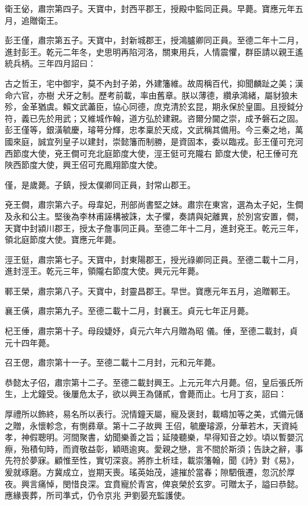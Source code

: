 \begin{pinyinscope}
 衛王佖，肅宗第四子。天寶中，封西平郡王，授殿中監同正員。早薨。寶應元年五月，追贈衛王。



 彭王僅，肅宗第五子。天寶中，封新城郡王，授鴻臚卿同正員。至德二年十二月，進封彭王。乾元二年冬，史思明再陷河洛，關東用兵，人情震懼，群臣請以親王遙統兵柄。三年四月詔曰：



 古之哲王，宅中御宇，莫不內封子弟，外建籓維。故周稱百代，抑聞麟趾之美；漢命六官，亦樹
 犬牙之制。歷考前載，率由舊章。朕以薄德，纘承鴻緒，屬豺狼未殄，金革猶虞。賴文武藎臣，協心同德，庶克清於玄昆，期永保於皇圖。且授鉞分符，義已先於用武；又維城作翰，道方弘於建親。咨爾分閫之崇，成予磐石之固。彭王僅等，銀潢毓慶，璿萼分輝，忠孝稟於天成，文武稱其備用。今三秦之地，萬國來庭，誠宜列皇子以建封，崇懿籓而制勝，是資固本，委以臨戎。彭王僅可充河西節度大使，兗王僴可充北庭節度大使，涇王侹可充隴右
 節度大使，杞王倕可充陜西節度大使，興王佋可充鳳翔節度大使。



 僅，是歲薨。子鎮，授太僕卿同正員，封常山郡王。



 兗王僴，肅宗第六子。母韋妃，刑部尚書堅之妹。肅宗在東宮，選為太子妃，生僴及永和公主。堅後為李林甫誣構被誅，太子懼，奏請與妃離異，於別宮安置，僴，天寶中封潁川郡王，授太子詹事同正員。至德二年十二月，進封兗王。乾元三年，領北庭節度大使。寶應元年薨。



 涇王侹，肅宗第七子。天寶中，封東陽郡王，授光祿卿同正員。至德二載十二月，進封涇王。乾元三年，領隴右節度大使。興元元年薨。



 鄆王榮，肅宗第八子。天寶中，封靈昌郡王。早世。寶應元年五月，追贈鄆王。



 襄王僙，肅宗第九子。至德二載十二月，封襄王。貞元七年正月薨。



 杞王倕，肅宗第十子。母段婕妤，貞元六年六月贈為昭
 儀。倕，至德二載封，貞元十四年薨。



 召王偲，肅宗第十一子。至德二載十二月封，元和元年薨。



 恭懿太子佋，肅宗第十二子。至德二載封興王。上元元年六月薨。佋，皇后張氏所生，上尤鐘受。後屢危太子，欲以興王為儲貳，會薨而止。七月丁亥，詔曰：



 厚禮所以飾終，易名所以表行。況情鐘天屬，寵及褒封，載疇加等之美，式備元儲之贈，永懷軫念，有惻彞章。第十二子故興
 王佋，毓慶璿源，分華若木，天資純孝，神假聰明。河間聚書，幼聞樂善之旨；延陵聽樂，早得知音之妙。頃以暫嬰沉瘵，殆積旬時，而資敬益彰，穎晤逾爽。愛親之戀，言不間於斯須；告訣之辭，事先符於夢寐。顧惟至性，實切深哀。將胙土析珪，載崇籓翰，聞《詩》對《易》，爰就琢磨。方冀成立，豈期天喪。瑤英始茂，遽摧於當春；隙駟俄遷，忽沉於厚夜。興言痛悼，閔惜良深。宜賁寵於青宮，俾哀榮於玄穸。可贈太子，謚曰恭懿。應緣喪葬，所司準式，仍令京兆
 尹劉晏充監護使。




\end{pinyinscope}
